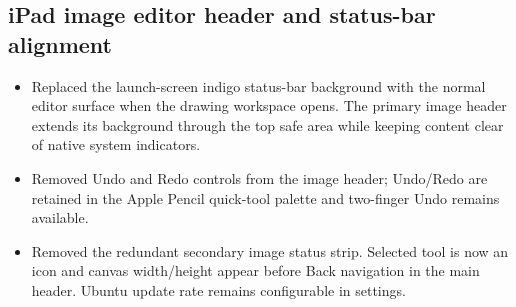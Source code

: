 \documentclass[a4paper]{article}
\title{}
\date{}
\author{Mohammad Rahmani}
\begin{document}
   \maketitle

   \begin{preview}
      \section{iPad image editor header and status-bar alignment}
\begin{itemize}
    \item Replaced the launch-screen indigo status-bar background with the normal editor surface when the drawing workspace opens. The primary image header extends its background through the top safe area while keeping content clear of native system indicators.
    \item Removed Undo and Redo controls from the image header; Undo/Redo are retained in the Apple Pencil quick-tool palette and two-finger Undo remains available.
    \item Removed the redundant secondary image status strip. Selected tool is now an icon and canvas width/height appear before Back navigation in the main header. Ubuntu update rate remains configurable in settings.
\end{itemize}
   \end{preview}

   
   
\end{document}
